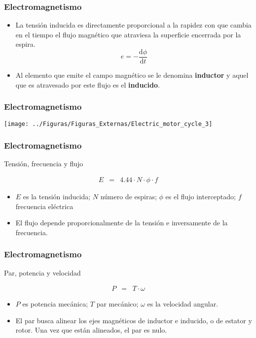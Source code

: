 \documentclass[serif, xcolor=dvipsnames]{beamer}
\begin{document}
\begin{frame}
  \frametitle{Electromagnetismo}
  \begin{itemize}
  \item La tensión inducida es directamente proporcional a la rapidez
    con que cambia en el tiempo el flujo magnético que atraviesa la
    superficie encerrada por la espira.
    \[
    e=-\frac{\mathrm{d}\phi}{\mathrm{d}t}
    \]

  \item Al elemento que emite el campo magnético se le
    denomina\textbf{ inductor} y aquel que es atravesado por este
    flujo es el \textbf{inducido}.
  \end{itemize}

\end{frame}
\begin{frame}[plain]
  \frametitle{Electromagnetismo}

  \begin{center}
    \texttt{[image: ../Figuras/Figuras\_Externas/Electric\_motor\_cycle\_3]}
    \par\end{center}


\end{frame}
\begin{frame}
  \frametitle{Electromagnetismo}
  \begin{block} {Tensión, frecuencia y flujo}

\begin{eqnarray*}
  E & = & 4.44\cdot N\cdot\phi\cdot f
\end{eqnarray*}

\begin{itemize}
\item $E$ es la tensión inducida; $N$ número de espiras; $\phi$ es el
  flujo interceptado; $f$ frecuencia eléctrica
\item El flujo depende proporcionalmente de la tensión e inversamente
  de la frecuencia.
\end{itemize}
\end{block}

\end{frame}
\begin{frame}
  \frametitle{Electromagnetismo}
  \begin{block} {Par, potencia y velocidad}

\begin{eqnarray*}
  P & = & T\cdot\omega
\end{eqnarray*}

\begin{itemize}
\item $P$ es potencia mecánica; $T$ par mecánico; $\omega$ es la
  velocidad angular.
\item El par busca alinear los ejes magnéticos de inductor e inducido,
  o de estator y rotor. Una vez que están alineados, el par es nulo.
\end{itemize}
\end{block}

\end{frame}
\end{document}
